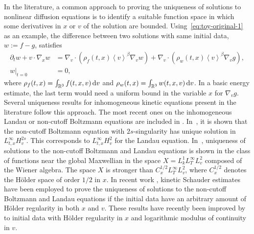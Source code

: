\documentclass[11pt,american, reqno]{amsart}
\numberwithin{equation}{section}
\newcommand{\R}{\mathbb R}
\newcommand{\1}{\mathds{1}}
\newcommand{\del}{\partial}
\newcommand{\dv}{\, {\rm d} v}
\newcommand{\vpran}[1]{\left(#1\right)}
\newcommand{\vint}[1]{\left\langle#1\right\rangle}
\numberwithin{equation}{section}
\begin{document}
\smallskip

In the literature, a common approach to proving the uniqueness of solutions to nonlinear diffusion equations is to identify a suitable function space in which some derivatives in $x$ or $v$ of the solution are bounded. Using~\eqref{eq:toy-original-1} as an example, the difference between two solutions with same initial data, $w := f - g$, satisfies 
\begin{align*}
 \del_t w + v \cdot \nabla_x w 
&= \nabla_v \cdot \vpran{\rho_f(t, x) \vint{v}^\beta \nabla_v w}
+ \nabla_v \cdot \vpran{\rho_w(t, x) \vint{v}^\beta \nabla_v g}, 
\\
 w|_{t=0} & = 0,
\end{align*}
where $\rho_f(t, x) =  \int_{\R^3} f(t, x, v) \dv$ and $\rho_w(t, x) =  \int_{\R^3} w(t, x, v) \dv$. In a basic energy estimate, the last term would need a uniform bound in the variable $x$ for $\nabla_v g$. Several uniqueness results for inhomogeneous kinetic equations present in the literature follow this approach.  The most recent ones on the inhomogeneous Landau or non-cutoff Boltzmann equations are included in \cites{AMUXY2011,DLSS2020, HST2020, HST2025, HW2024}. In~\cite{AMUXY2011}, it is shown that the non-cutoff Boltzmann equation with $2s$-singularity has unique solution in $L^\infty_{t,x}H^{2s}_v$. This corresponds to $L^\infty_{t,x}H^{2}_v$ for the Landau equation. In~\cite{DLSS2020}, uniqueness of solutions to the non-cutoff Boltzmann and Landau equations is shown in the class of functions near the global Maxwellian in the space $X = L^1_k L^\infty_T L^2_v$ composed of the Wiener algebra. The space $X$ is stronger than $C^{1/2}_x L^\infty_T L^2_v$, where $C^{1/2}_x$ denotes the H\"older space of order $1/2$ in $x$. In recent work \cite{HST2020, HST2025}, kinetic Schauder estimates have been employed to prove the uniqueness of solutions to the non-cutoff Boltzmann and Landau equations if the initial data have an arbitrary amount of H\"older regularity in both $x$ and $v$. These results have recently been improved by~\cite{HW2024} to initial data with H\"older regularity in $x$ and logarithmic modulus of continuity in $v$.
\end{document}
